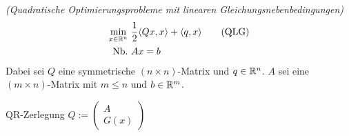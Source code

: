 

\begin{definition}
\emph{(Quadratische Optimierungsprobleme mit linearen
Gleichungsnebenbedingungen)}
\begin{align}
  \min_{x \in \R^n}\ &
    \frac{1}{2} \langle Qx,x \rangle + \langle q,x \rangle 
    \tag{QLG} \label{prob:quad_prog_mit_lin_restr} \\
  \nb & Ax = b \notag
\end{align}
Dabei sei $Q$ eine symmetrische $(n \times n)$-Matrix und $q \in \mathbb{R}^n$.
$A$ sei eine $(m \times n)$-Matrix mit $m \leq n$ und $b \in \mathbb{R}^m$.
\end{definition}

QR-Zerlegung
$Q := \left(\begin{array}{c} A \\ G(x) \end{array}\right)$
